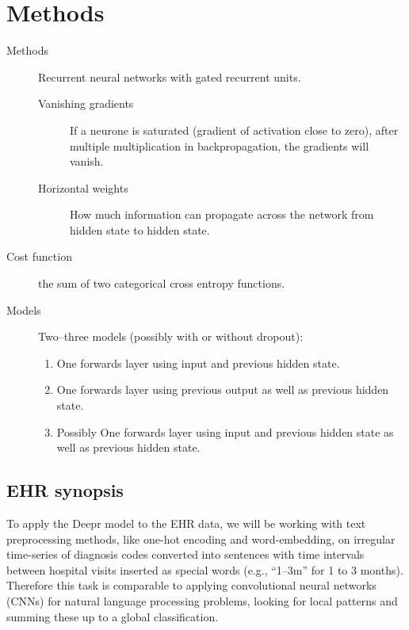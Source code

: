 \section{Methods}
\label{sec:method}

\begin{description}
	\item[Methods] Recurrent neural networks with gated recurrent units.
	
	\begin{description}
		\item[Vanishing gradients] If a neurone is saturated (gradient of activation close to zero), after multiple multiplication in backpropagation, the gradients will vanish.
		\item[Horizontal weights] How much information can propagate across the network from hidden state to hidden state.
	\end{description}
	
	\item [Cost function] the sum of two categorical cross entropy functions.
	
	\item[Models] Two--three models (possibly with or without dropout):
	
	\begin{enumerate}
		\item One forwards layer using input and previous hidden state.
		\item One forwards layer using previous output as well as previous hidden state.
		\item Possibly One forwards layer using input and previous hidden state as well as previous hidden state.
	\end{enumerate}
\end{description}

\subsection*{EHR synopsis}

To apply the Deepr model to the EHR data, we will be working with text preprocessing methods, like one-hot encoding and word-embedding, on irregular time-series of diagnosis codes converted into sentences with time intervals between hospital visits inserted as special words (e.g., “1--3m” for 1 to 3 months). Therefore this task is comparable to applying convolutional neural networks (CNNs) for natural language processing problems, looking for local patterns and summing these up to a global classification.

